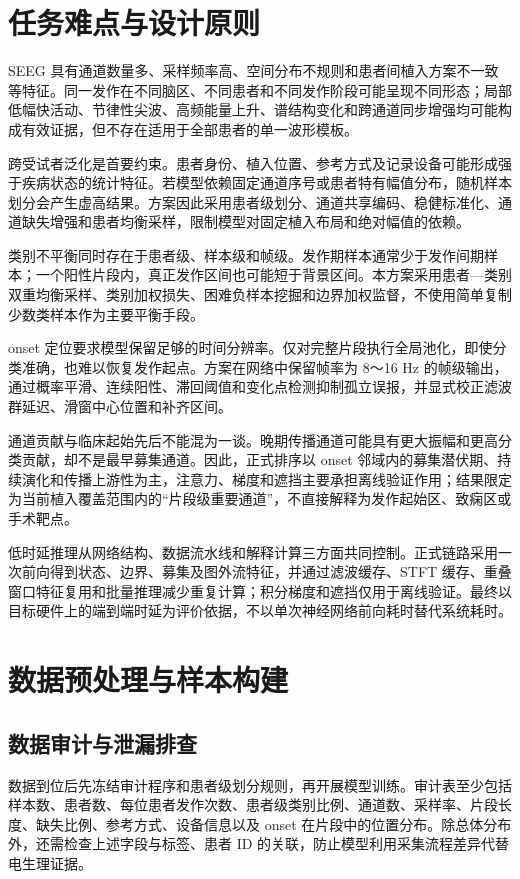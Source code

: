 \documentclass{cumcmthesis_v2}
\numberwithin{figure}{section} %
\numberwithin{table}{section} %
\begin{document}
\clearpage

\section{任务难点与设计原则}

SEEG 具有通道数量多、采样频率高、空间分布不规则和患者间植入方案不一致等特征。同一发作在不同脑区、不同患者和不同发作阶段可能呈现不同形态；局部低幅快活动、节律性尖波、高频能量上升、谱结构变化和跨通道同步增强均可能构成有效证据，但不存在适用于全部患者的单一波形模板。

跨受试者泛化是首要约束。患者身份、植入位置、参考方式及记录设备可能形成强于疾病状态的统计特征。若模型依赖固定通道序号或患者特有幅值分布，随机样本划分会产生虚高结果。方案因此采用患者级划分、通道共享编码、稳健标准化、通道缺失增强和患者均衡采样，限制模型对固定植入布局和绝对幅值的依赖。

类别不平衡同时存在于患者级、样本级和帧级。发作期样本通常少于发作间期样本；一个阳性片段内，真正发作区间也可能短于背景区间。本方案采用患者—类别双重均衡采样、类别加权损失、困难负样本挖掘和边界加权监督，不使用简单复制少数类样本作为主要平衡手段。

onset 定位要求模型保留足够的时间分辨率。仅对完整片段执行全局池化，即使分类准确，也难以恢复发作起点。方案在网络中保留帧率为 8～16 Hz 的帧级输出，通过概率平滑、连续阳性、滞回阈值和变化点检测抑制孤立误报，并显式校正滤波群延迟、滑窗中心位置和补齐区间。

通道贡献与临床起始先后不能混为一谈。晚期传播通道可能具有更大振幅和更高分类贡献，却不是最早募集通道。因此，正式排序以 onset 邻域内的募集潜伏期、持续演化和传播上游性为主，注意力、梯度和遮挡主要承担离线验证作用；结果限定为当前植入覆盖范围内的“片段级重要通道”，不直接解释为发作起始区、致痫区或手术靶点。

低时延推理从网络结构、数据流水线和解释计算三方面共同控制。正式链路采用一次前向得到状态、边界、募集及图外流特征，并通过滤波缓存、STFT 缓存、重叠窗口特征复用和批量推理减少重复计算；积分梯度和遮挡仅用于离线验证。最终以目标硬件上的端到端时延为评价依据，不以单次神经网络前向耗时替代系统耗时。


\clearpage

\section{数据预处理与样本构建}
\subsection{数据审计与泄漏排查}
数据到位后先冻结审计程序和患者级划分规则，再开展模型训练。审计表至少包括样本数、患者数、每位患者发作次数、患者级类别比例、通道数、采样率、片段长度、缺失比例、参考方式、设备信息以及 onset 在片段中的位置分布。除总体分布外，还需检查上述字段与标签、患者 ID 的关联，防止模型利用采集流程差异代替电生理证据。
\end{document}
